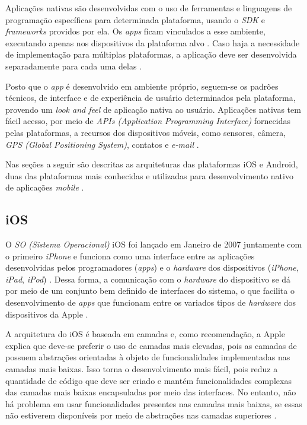 Aplicações nativas são desenvolvidas com o uso de ferramentas e linguagens de programação específicas para determinada plataforma, 
usando o \textit{SDK} e \textit{frameworks} providos por ela. Os \textit{apps} ficam vinculados a esse ambiente, executando apenas 
nos dispositivos da plataforma alvo \cite{kassas_taxonomy_2015}. Caso haja a necessidade de implementação para múltiplas plataformas, 
a aplicação deve ser desenvolvida separadamente para cada uma delas \cite{heitkotter_evaluating_2013}.

Posto que o \textit{app} é desenvolvido em ambiente próprio, seguem-se os padrões técnicos, de interface e de experiência de usuário determinados pela plataforma, provendo um \textit{look and feel} de aplicação nativa ao usuário.
Aplicações nativas tem fácil acesso, por meio de \textit{APIs (Application Programming Interface)} fornecidas pelas plataformas, a recursos dos dispositivos móveis, como sensores, câmera, \textit{GPS (Global Positioning System)}, contatos e \textit{e-mail} \cite{kassas_taxonomy_2015}.

Nas seções a seguir são descritas as arquiteturas das plataformas iOS e Android, duas das plataformas mais conhecidas e utilizadas para desenvolvimento nativo de aplicações \textit{mobile} \cite{jobe_native_2013}.

\subsection{iOS} \label{subsection:ios}

O \textit{SO (Sistema Operacional)} iOS foi lançado em Janeiro de 2007 juntamente com o primeiro \textit{iPhone} e 
funciona como uma interface entre as aplicações desenvolvidas pelos programadores (\textit{apps}) e o \textit{hardware} 
dos dispositivos (\textit{iPhone}, \textit{iPad}, \textit{iPod}) \cite{apple_inc_apple_2007}. 
Dessa forma, a comunicação com o \textit{hardware} do dispositivo se dá 
por meio de um conjunto bem definido de interfaces do sistema, o que facilita o desenvolvimento de \textit{apps} 
que funcionam entre os variados tipos de \textit{hardware} dos dispositivos da Apple \cite{apple_inc_developing_2016}. 

A arquitetura do iOS é baseada em camadas e, como recomendação, a Apple explica que deve-se preferir o uso de camadas mais elevadas, pois as camadas de 
possuem abstrações orientadas à objeto de funcionalidades implementadas nas camadas mais baixas. Isso 
torna o desenvolvimento mais fácil, pois reduz a quantidade de código que deve ser criado e mantém funcionalidades 
complexas das camadas mais baixas encapsuladas por meio das interfaces. No entanto, não há problema em usar 
funcionalidades presentes nas camadas mais baixas, se essas não estiverem disponíveis por meio de abstrações nas 
camadas superiores \cite{apple_inc_tech_2014}. 

